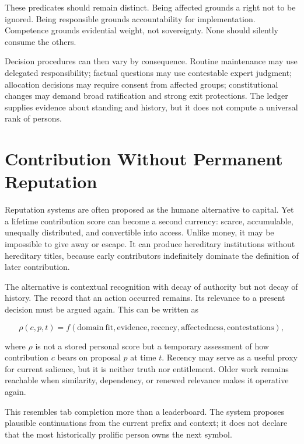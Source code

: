 \documentclass[11pt,oneside]{article}
\theoremstyle{plain}
\theoremstyle{definition}
\begin{document}
These predicates should remain distinct. Being affected grounds a right not to be ignored. Being responsible grounds accountability for implementation. Competence grounds evidential weight, not sovereignty. None should silently consume the others.

Decision procedures can then vary by consequence. Routine maintenance may use delegated responsibility; factual questions may use contestable expert judgment; allocation decisions may require consent from affected groups; constitutional changes may demand broad ratification and strong exit protections. The ledger supplies evidence about standing and history, but it does not compute a universal rank of persons.

\section{Contribution Without Permanent Reputation}

Reputation systems are often proposed as the humane alternative to capital. Yet a lifetime contribution score can become a second currency: scarce, accumulable, unequally distributed, and convertible into access. Unlike money, it may be impossible to give away or escape. It can produce hereditary institutions without hereditary titles, because early contributors indefinitely dominate the definition of later contribution.

The alternative is contextual recognition with decay of authority but not decay of history. The record that an action occurred remains. Its relevance to a present decision must be argued again. This can be written as

\begin{equation}
\rho(c,p,t)=f(\mathrm{domain\ fit},\mathrm{evidence},\mathrm{recency},
\mathrm{affectedness},\mathrm{contestations}),
\end{equation}

where $\rho$ is not a stored personal score but a temporary assessment of how contribution $c$ bears on proposal $p$ at time $t$. Recency may serve as a useful proxy for current salience, but it is neither truth nor entitlement. Older work remains reachable when similarity, dependency, or renewed relevance makes it operative again.

This resembles tab completion more than a leaderboard. The system proposes plausible continuations from the current prefix and context; it does not declare that the most historically prolific person owns the next symbol.
\end{document}
